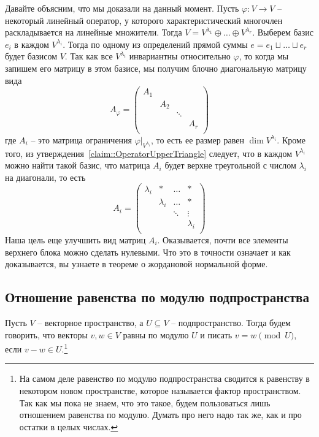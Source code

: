 Давайте объясним, что мы доказали на данный момент. Пусть $\varphi\colon V\to V$ -- некоторый линейный оператор, у которого характеристический многочлен раскладывается на линейные множители. Тогда $V = V^{\lambda_1}\oplus\ldots\oplus V^{\lambda_r}$. Выберем базис $e_i$ в каждом $V^{\lambda_i}$. Тогда по одному из определений прямой суммы $e = e_1 \sqcup \ldots \sqcup e_r$ будет базисом $V$. Так как все $V^{\lambda_i}$ инвариантны относительно $\varphi$, то когда мы запишем его матрицу в этом базисе, мы получим блочно диагональную матрицу вида
\[
A_\varphi = 
\begin{pmatrix}
{A_1}&{}&{}&{}\\
{}&{A_2}&{}&{}\\
{}&{}&{\ddots}&{}\\
{}&{}&{}&{A_r}\\
\end{pmatrix}
\]
где $A_i$ -- это матрица ограничения $\varphi|_{V^{\lambda_i}}$, то есть ее размер равен $\dim V^{\lambda_i}$. Кроме того, из утверждения~\ref{claim::OperatorUpperTriangle} следует, что в каждом $V^{\lambda_i}$ можно найти такой базис, что матрица $A_i$ будет верхне треугольной с числом $\lambda_i$ на диагонали, то есть
\[
A_i = 
\begin{pmatrix}
{\lambda_i}&{*}&{\ldots}&{*}\\
{}&{\lambda_i}&{\ldots}&{*}\\
{}&{}&{\ddots}&{\vdots}\\
{}&{}&{}&{\lambda_i}\\
\end{pmatrix}
\]
Наша цель еще улучшить вид матриц $A_i$. Оказывается, почти все элементы верхнего блока можно сделать нулевыми. Что это в точности означает и как доказывается, вы узнаете в теореме о жордановой нормальной форме.


\subsection{Отношение равенства по модулю подпространства}

\begin{definition}
Пусть $V$ -- векторное пространство, а $U\subseteq V$ -- подпространство. Тогда будем говорить, что векторы $v,w\in V$ равны по модулю $U$ и писать $v = w \pmod U$, если $v - w \in U$.\footnote{На самом деле равенство по модулю подпространства сводится к равенству в некотором новом пространстве, которое называется фактор пространством. Так как мы пока не знаем, что это такое, будем пользоваться лишь отношением равенства по модулю. Думать про него надо так же, как и про остатки в целых числах.}
\end{definition}

